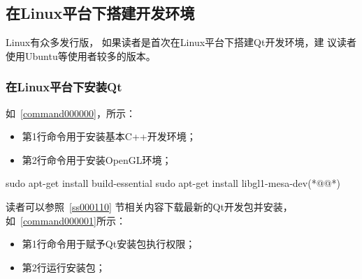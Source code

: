 ﻿




%

\FloatBarrier
\subsection{
在Linux平台下搭建开发环境
}\label{s000210}


Linux有众多发行版，
如果读者是首次在Linux平台下搭建Qt开发环境，建
议读者使用Ubuntu等使用者较多的版本。

\FloatBarrier
\subsubsection{
在Linux平台下安装Qt
}\label{ss000410}



如\commandnumbernameone\ \ref{command000000}，所示：

\begin{itemize}
\item 第1行命令用于安装基本C{\sourcefonttwo{}+}{\sourcefonttwo{}+}开发环境；
\item 第2行命令用于安装OpenGL环境；
\end{itemize}

{}\label{command000000}    %
\begin{thebookfilesourceonecommand}[escapeinside={(*@}{@*)},
caption=GoodLuck,
title=\commandnumbernameone \thecommandnumber
]
sudo apt-get install build-essential
sudo apt-get install libgl1-mesa-dev(*@\marginpar[\hfill\setlength\fboxsep{2pt}\fbox{\footnotesize{\kaishu\parbox{1em}{\setlength{\baselineskip}{2pt}\commandnumbernameone}}\footnotesize{\thecommandnumber}}]{\setlength\fboxsep{2pt}\fbox{\footnotesize{\kaishu\parbox{1em}{\setlength{\baselineskip}{2pt}\commandnumbernameone}}\footnotesize{\thecommandnumber}}}@*)\end{thebookfilesourceonecommand}          %
\addtocounter{lstlisting}{-1}   %


读者可以参照\ \ref{ss000110}
节相关内容下载最新的Qt开发包并安装，如\commandnumbernameone\ \ref{command000001}所示：

\begin{itemize}
\item 第1行命令用于赋予Qt安装包执行权限；
\item 第2行运行安装包；
\end{itemize}

